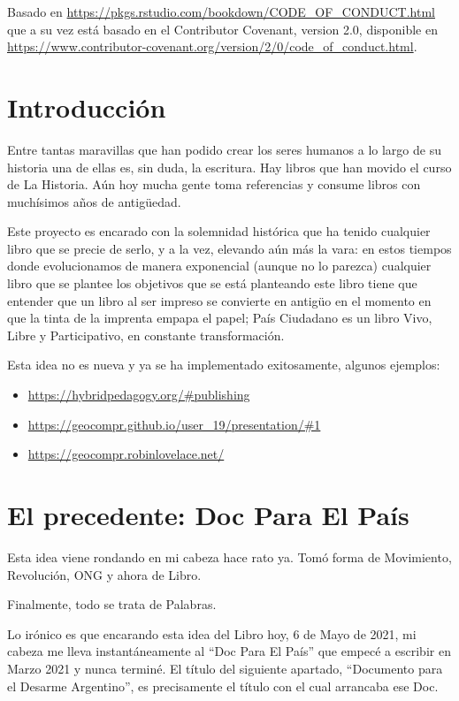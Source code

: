 \documentclass[
]{book}
\providecommand{\tightlist}{%
  \setlength{\itemsep}{0pt}\setlength{\parskip}{0pt}}
\begin{document}
Basado en \url{https://pkgs.rstudio.com/bookdown/CODE_OF_CONDUCT.html} que a su vez está basado en el Contributor Covenant, version 2.0, disponible en \url{https://www.contributor-covenant.org/version/2/0/code_of_conduct.html}.

\hypertarget{intro}{%
\chapter{Introducción}\label{intro}}

Entre tantas maravillas que han podido crear los seres humanos a lo largo de su historia una de ellas es, sin duda, la escritura. Hay libros que han movido el curso de La Historia. Aún hoy mucha gente toma referencias y consume libros con muchísimos años de antigüedad.

Este proyecto es encarado con la solemnidad histórica que ha tenido cualquier libro que se precie de serlo, y a la vez, elevando aún más la vara: en estos tiempos donde evolucionamos de manera exponencial (aunque no lo parezca) cualquier libro que se plantee los objetivos que se está planteando este libro tiene que entender que un libro al ser impreso se convierte en antigüo en el momento en que la tinta de la imprenta empapa el papel; País Ciudadano es un libro Vivo, Libre y Participativo, en constante transformación.

Esta idea no es nueva y ya se ha implementado exitosamente, algunos ejemplos:

\begin{itemize}
\tightlist
\item
  \url{https://hybridpedagogy.org/\#publishing}
\item
  \url{https://geocompr.github.io/user_19/presentation/\#1}
\item
  \url{https://geocompr.robinlovelace.net/}
\end{itemize}

\hypertarget{el-precedente-doc-para-el-pauxeds}{%
\chapter{El precedente: Doc Para El País}\label{el-precedente-doc-para-el-pauxeds}}

Esta idea viene rondando en mi cabeza hace rato ya. Tomó forma de Movimiento, Revolución, ONG y ahora de Libro.

Finalmente, todo se trata de Palabras.

Lo irónico es que encarando esta idea del Libro hoy, 6 de Mayo de 2021, mi cabeza me lleva instantáneamente al ``Doc Para El País'' que empecé a escribir en Marzo 2021 y nunca terminé. El título del siguiente apartado, ``Documento para el Desarme Argentino'', es precisamente el título con el cual arrancaba ese Doc.
\end{document}
